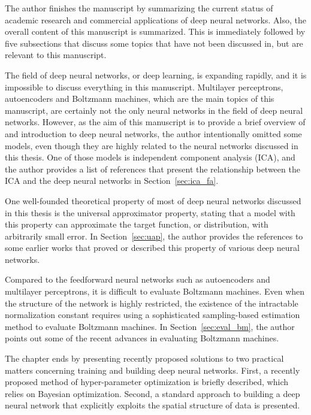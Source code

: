 \documentclass{now}
\begin{document}
The author finishes the manuscript by summarizing the current status of
academic research and commercial applications of deep neural networks. Also,
the overall content of this manuscript is summarized.  
This is immediately followed by five subsections that discuss some topics that
have not been discussed in, but are relevant to this manuscript.

The field of deep neural networks, or deep learning, is expanding rapidly, and
it is impossible to discuss everything in this manuscript. Multilayer
perceptrons, autoencoders and  Boltzmann machines, which are the main topics of
this manuscript, are certainly not the only neural networks in the field of
deep neural networks. However, as the aim of this manuscript is to provide a
brief overview of and introduction to deep neural networks, the author
intentionally omitted some models, even though they are highly related to the
neural networks discussed in this thesis. One of those models is independent
component analysis (ICA), and
the author provides a list of references that present the relationship between
the ICA and the deep neural networks in Section~\ref{sec:ica_fa}.

One well-founded theoretical property of most of deep neural networks discussed
in this thesis is the universal approximator property, stating that a model
with this property can approximate the target function, or distribution, with
arbitrarily small error. In Section~\ref{sec:uap}, the author provides the
references to some earlier works that proved or described this property of
various deep neural networks.

Compared to the feedforward neural networks such as autoencoders and multilayer
perceptrons, it is difficult to evaluate Boltzmann machines. Even when the
structure of the network is highly restricted, the existence of the intractable
normalization constant requires using a sophisticated sampling-based estimation
method to evaluate Boltzmann machines. In Section~\ref{sec:eval_bm}, the author
points out some of the recent advances in evaluating Boltzmann machines.

The chapter ends by presenting recently proposed solutions to two practical
matters concerning training and building deep neural networks. First, a
recently proposed method of hyper-parameter optimization is briefly described,
which relies on Bayesian optimization. Second, a standard approach to building
a deep neural network that explicitly exploits the spatial structure of data is
presented.
\end{document}
